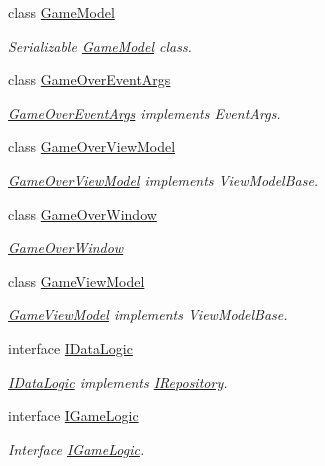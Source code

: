 \begin{DoxyCompactItemize}
class \mbox{\hyperlink{class_game_1_1_game_model}{Game\+Model}}
\begin{DoxyCompactList}\small\item\em Serializable \mbox{\hyperlink{class_game_1_1_game_model}{Game\+Model}} class. \end{DoxyCompactList}\item 
class \mbox{\hyperlink{class_game_1_1_game_over_event_args}{Game\+Over\+Event\+Args}}
\begin{DoxyCompactList}\small\item\em \mbox{\hyperlink{class_game_1_1_game_over_event_args}{Game\+Over\+Event\+Args}} implements Event\+Args. \end{DoxyCompactList}\item 
class \mbox{\hyperlink{class_game_1_1_game_over_view_model}{Game\+Over\+View\+Model}}
\begin{DoxyCompactList}\small\item\em \mbox{\hyperlink{class_game_1_1_game_over_view_model}{Game\+Over\+View\+Model}} implements View\+Model\+Base. \end{DoxyCompactList}\item 
class \mbox{\hyperlink{class_game_1_1_game_over_window}{Game\+Over\+Window}}
\begin{DoxyCompactList}\small\item\em \mbox{\hyperlink{class_game_1_1_game_over_window}{Game\+Over\+Window}} \end{DoxyCompactList}\item 
class \mbox{\hyperlink{class_game_1_1_game_view_model}{Game\+View\+Model}}
\begin{DoxyCompactList}\small\item\em \mbox{\hyperlink{class_game_1_1_game_view_model}{Game\+View\+Model}} implements View\+Model\+Base. \end{DoxyCompactList}\item 
interface \mbox{\hyperlink{interface_game_1_1_i_data_logic}{I\+Data\+Logic}}
\begin{DoxyCompactList}\small\item\em \mbox{\hyperlink{interface_game_1_1_i_data_logic}{I\+Data\+Logic}} implements \mbox{\hyperlink{interface_game_1_1_i_repository}{I\+Repository}}. \end{DoxyCompactList}\item 
interface \mbox{\hyperlink{interface_game_1_1_i_game_logic}{I\+Game\+Logic}}
\begin{DoxyCompactList}\small\item\em Interface \mbox{\hyperlink{interface_game_1_1_i_game_logic}{I\+Game\+Logic}}. \end{DoxyCompactList}\item 

\end{DoxyCompactItemize}
